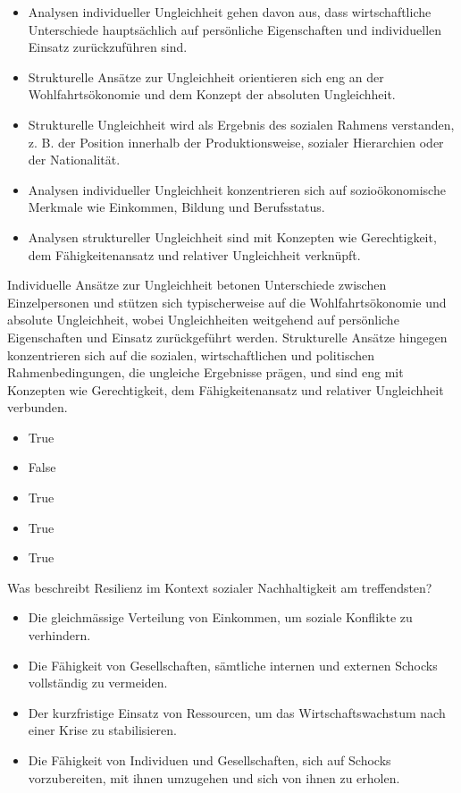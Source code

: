 \documentclass[
  nswissgerman,
  a4paper,
  DIV=11,
  numbers=noendperiod,
  oneside,
  openany]{scrreprt}
\providecommand{\tightlist}{%
  \setlength{\itemsep}{0pt}\setlength{\parskip}{0pt}}
\begin{document}
\begin{itemize}
\tightlist
\item[$\square$]
  Analysen individueller Ungleichheit gehen davon aus, dass
  wirtschaftliche Unterschiede hauptsächlich auf persönliche
  Eigenschaften und individuellen Einsatz zurückzuführen sind.
\item[$\square$]
  Strukturelle Ansätze zur Ungleichheit orientieren sich eng an der
  Wohlfahrtsökonomie und dem Konzept der absoluten Ungleichheit.
\item[$\square$]
  Strukturelle Ungleichheit wird als Ergebnis des sozialen Rahmens
  verstanden, z. B. der Position innerhalb der Produktionsweise,
  sozialer Hierarchien oder der Nationalität.
\item[$\square$]
  Analysen individueller Ungleichheit konzentrieren sich auf
  sozioökonomische Merkmale wie Einkommen, Bildung und Berufsstatus.
\item[$\square$]
  Analysen struktureller Ungleichheit sind mit Konzepten wie
  Gerechtigkeit, dem Fähigkeitenansatz und relativer Ungleichheit
  verknüpft.
\end{itemize}

Individuelle Ansätze zur Ungleichheit betonen Unterschiede zwischen
Einzelpersonen und stützen sich typischerweise auf die
Wohlfahrtsökonomie und absolute Ungleichheit, wobei Ungleichheiten
weitgehend auf persönliche Eigenschaften und Einsatz zurückgeführt
werden. Strukturelle Ansätze hingegen konzentrieren sich auf die
sozialen, wirtschaftlichen und politischen Rahmenbedingungen, die
ungleiche Ergebnisse prägen, und sind eng mit Konzepten wie
Gerechtigkeit, dem Fähigkeitenansatz und relativer Ungleichheit
verbunden.

\begin{itemize}
\tightlist
\item
  True
\item
  False
\item
  True
\item
  True
\item
  True
\end{itemize}

Was beschreibt Resilienz im Kontext sozialer Nachhaltigkeit am
treffendsten?

\begin{itemize}
\tightlist
\item[$\square$]
  Die gleichmässige Verteilung von Einkommen, um soziale Konflikte zu
  verhindern.
\item[$\square$]
  Die Fähigkeit von Gesellschaften, sämtliche internen und externen
  Schocks vollständig zu vermeiden.
\item[$\square$]
  Der kurzfristige Einsatz von Ressourcen, um das Wirtschaftswachstum
  nach einer Krise zu stabilisieren.
\item[$\square$]
  Die Fähigkeit von Individuen und Gesellschaften, sich auf Schocks
  vorzubereiten, mit ihnen umzugehen und sich von ihnen zu erholen.
\end{itemize}
\end{document}

